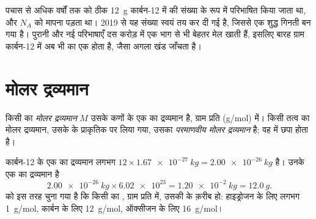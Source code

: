 \begin{remark}[यह संख्या कहाँ से आती है]\label{rem:g10:the-mole:origin}
पचास से अधिक वर्षों तक  को ठीक \qty{12}{g} कार्बन-12 में  की
संख्या के रूप में परिभाषित किया जाता था, और $N_A$ को मापना पड़ता था।
2019 से यह संख्या स्वयं तय कर दी गई है, जिससे  एक शुद्ध गिनती बन गया है।
पुरानी और नई परिभाषाएँ दस करोड़ में एक भाग से भी बेहतर मेल खाती हैं, इसलिए
बारह ग्राम कार्बन-12 में अब भी  का एक  होता है, जैसा अगला खंड
जाँचता है।
\end{remark}

\section{मोलर द्रव्यमान}

\begin{definition}[मोलर द्रव्यमान]\label{def:g10:the-mole:molar-mass}
किसी  का \emph{मोलर द्रव्यमान} $M$ उसके
कणों के एक  का द्रव्यमान है, ग्राम प्रति  (\si{g/mol}) में। किसी
तत्व का मोलर द्रव्यमान, उसके  के प्राकृतिक  पर लिया गया, उसका
\emph{परमाणवीय मोलर द्रव्यमान} है; वह
 में छपा होता है।
\end{definition}

\begin{example}[कार्बन परमाणुओं का एक मोल]\label{ex:g10:the-mole:carbon}
कार्बन-12 के एक  का द्रव्यमान लगभग
$12 \times \qty{1.67e-27}{kg} = \qty{2.00e-26}{kg}$ है। उनके एक  का
द्रव्यमान है
\[
  \qty{2.00e-26}{kg} \times \num{6.02e23} = \qty{1.20e-2}{kg}
  = \qty{12.0}{g}.
\]
 को इस तरह चुना गया है कि किसी  का , ग्राम प्रति  में,
उसकी  के क़रीब हो: हाइड्रोजन के लिए लगभग \qty{1}{g/mol},
कार्बन के लिए \qty{12}{g/mol}, ऑक्सीजन के लिए \qty{16}{g/mol}।
\end{example}


